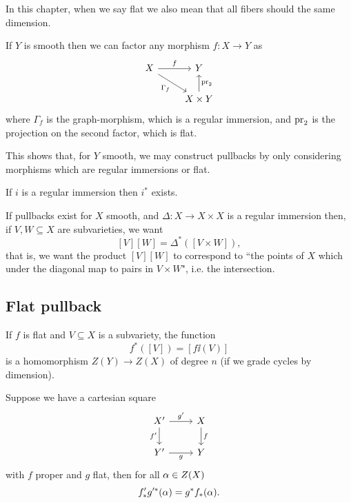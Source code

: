 \begin{notation}
In this chapter, when we say flat we also mean that all fibers should the same dimension. 
\end{notation}

\begin{fact}[]
If $Y$ is smooth then we can factor any morphism $f:X\to Y$ as
\[\begin{tikzcd}
	X & Y \\
	& {X\times Y}
	\arrow["f", from=1-1, to=1-2]
	\arrow["{\Gamma_f}"', from=1-1, to=2-2]
	\arrow["{\pr_2}"', from=2-2, to=1-2]
\end{tikzcd}\]
where $\Gamma_f$ is the graph-morphism, which is a regular immersion, and $\mathrm{pr}_2$ is the projection on the second factor, which is flat. 
\end{fact}

This shows that, for $Y$ smooth, we may construct pullbacks by only considering morphisms which are regular immersions or flat.

\begin{theorem}[]
If $i$ is a regular immersion then $i^\ast$ exists.
\end{theorem}

\begin{remark}
If pullbacks exist for $X$ smooth, and $\Delta:X\to X\times X$ is a regular immersion then, if $V,W\subseteq X$ are subvarieties, we want
\[[V][W]=\Delta^\ast([V\times W]),\]
that is, we want the product $[V][W]$ to correspond to ``the points of $X$ which under the diagonal map to pairs in $V\times W$", i.e. the intersection.
\end{remark}

\subsection{Flat pullback}
\begin{theorem}[]
If $f$ is flat and $V\subseteq X$ is a subvariety, the function
\[f^\ast([V])=[f\ii(V)]\]
is a homomorphism $Z(Y)\to Z(X)$ of degree $n$ (if we grade cycles by dimension).
\end{theorem}



\begin{proposition}[]
Suppose we have a cartesian square
\[\begin{tikzcd}
	{X'} & X \\
	{Y'} & Y
	\arrow["{g'}", from=1-1, to=1-2]
	\arrow["{f'}"', from=1-1, to=2-1]
	\arrow["f", from=1-2, to=2-2]
	\arrow["g"', from=2-1, to=2-2]
\end{tikzcd}\]
with $f$ proper and $g$ flat, then for all $\alpha\in Z(X)$
\[f_\ast'g'^\ast(\alpha)=g^\ast f_\ast(\alpha).\]
\end{proposition}


